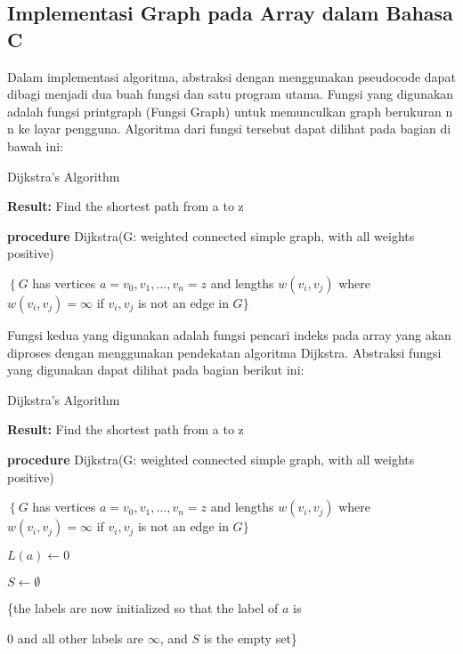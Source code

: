 \documentclass[10pt, conference]{IEEEtran}
\begin{document}
\subsection{Implementasi Graph pada Array dalam Bahasa C}
Dalam implementasi algoritma, abstraksi dengan menggunakan pseudocode dapat dibagi menjadi dua buah fungsi dan satu program utama. Fungsi yang digunakan adalah fungsi printgraph (Fungsi Graph) untuk memunculkan graph berukuran n  n ke layar pengguna. Algoritma dari fungsi tersebut dapat dilihat pada bagian di bawah ini:

\begin{algorithm}

\caption{Dijkstra’s Algorithm}
\label{alg:two}

\textbf{Result:} Find the shortest path from a to $\mathrm{z}$

\textbf{procedure} Dijkstra(G: weighted connected simple graph, with all weights positive)

$\left\{G\right.$ has vertices $a=v_{0}, v_{1}, \ldots, v_{n}=z$ and lengths $w\left(v_{i}, v_{j}\right)$ where $w\left(v_{i}, v_{j}\right)=\infty$ if $v_{i}, v_{j}$ is not an edge in $G\}$

\end{algorithm}

Fungsi kedua yang digunakan adalah fungsi pencari indeks pada array yang akan diproses dengan menggunakan pendekatan algoritma Dijkstra. Abstraksi fungsi yang digunakan dapat dilihat pada bagian berikut ini: 

\begin{algorithm}

\caption{Dijkstra’s Algorithm}
\label{alg:two}

\textbf{Result:} Find the shortest path from a to $\mathrm{z}$

\textbf{procedure} Dijkstra(G: weighted connected simple graph, with all weights positive)

$\left\{G\right.$ has vertices $a=v_{0}, v_{1}, \ldots, v_{n}=z$ and lengths $w\left(v_{i}, v_{j}\right)$ where $w\left(v_{i}, v_{j}\right)=\infty$ if $v_{i}, v_{j}$ is not an edge in $G\}$


$L(a)\gets0$

$S\gets\emptyset$

\{the labels are now initialized so that the label of $a$ is

0 and all other labels are $\infty$, and $S$ is the empty set\}

\end{algorithm}
\end{document}
